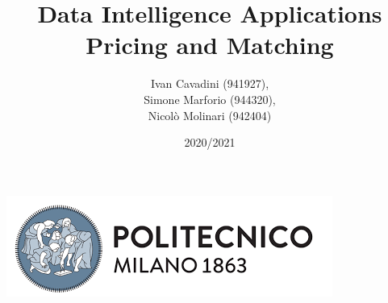 \begin{titlepage}
        \title{Data Intelligence Applications\\Pricing and Matching}
		\date{2020/2021}
        \author{Ivan Cavadini (941927),\\Simone Marforio (944320),\\Nicolò Molinari (942404)}
		\maketitle
		\begin{center}
			\includegraphics[scale=0.5]{Images/PolimiLogo}
		\end{center}
\end{titlepage}